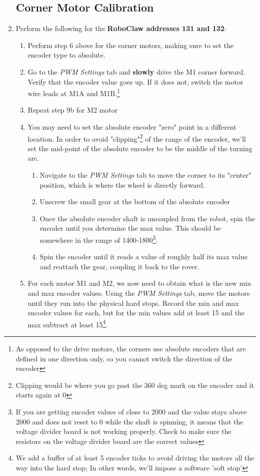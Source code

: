 \documentclass[12pt]{article}
\begin{document}
\begin{enumerate}
\subsection{Corner Motor Calibration}
\label{corner_cal}
	\item Perform the following for the \textbf{RoboClaw addresses 131 and 132}:
	\begin{enumerate}
		\item Perform step 6 above for the corner motors, making sure to set the encoder type to absolute. 
		\item Go to the \textit{PWM Settings} tab and \textbf{slowly} drive the M1 corner forward. Verify that the encoder value goes up. If it does not, switch the motor wire leads at M1A and M1B.\footnote{As opposed to the drive motors, the corners use absolute encoders that are defined in one direction only, so you cannot switch the direction of the encoder}
		\item Repeat step 9b for M2 motor
		\item You may need to set the absolute encoder "zero" point in a different location. In order to avoid "clipping"\footnote{Clipping would be where you go past the 360 deg mark on the encoder and it starts again at 0} of the range of the encoder, we'll set the mid-point of the absolute encoder to be the middle of the turning arc. 
		\begin{enumerate} 
			\item Navigate to the \textit{PWM Settings} tab to move the corner to its "center" position, which is where the wheel is directly forward. 
			\item Unscrew the small gear at the bottom of the absolute encoder
			\item Once the absolute encoder shaft is uncoupled from the robot, spin the encoder until you determine the max value. This should be somewhere in the range of 1400-1800\footnote{If you are getting encoder values of close to 2000 and the value stays above 2000 and does not reset to 0 while the shaft is spinning, it means that the voltage divider board is not working properly. Check to make sure the resistors on the voltage divider board are the correct values}.
			\item Spin the encoder until it reads a value of roughly half its max value and reattach the gear, coupling it back to the rover. 
		\end{enumerate}
		
		\item For each motor M1 and M2, we now need to obtain what is the new min and max encoder values. Using the \textit{PWM Settings} tab, move the motors until they run into the physical hard stops. Record the min and max encoder values for each, but for the min values add at least 15 and the max subtract at least 15\footnote{We add a buffer of at least 5 encoder ticks to avoid driving the motors all the way into the hard stop; In other words, we'll impose a software 'soft stop'}.


\end{enumerate}
\end{enumerate}
\end{document}
